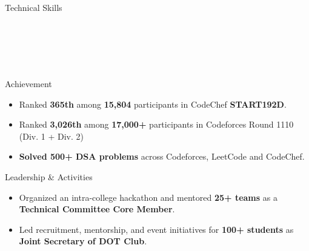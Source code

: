 \documentclass{resume}
\begin{document}
\begin{skillsSection}{Technical Skills}

    \skillItem[
        category={Languages:},
        skills={C/C++, Go, Python, Java, Javascript, SQL}
    ]
    \\
    \skillItem[
        category={Frontend:},
        skills={React.js, React Flow, Next.js, TypeScript}
    ]
    \\
    \skillItem[
        category={Backend \& System:},
        skills={FastAPI, Node.js, gRPC, REST APIs, Kafka, Redis}
    ]
    \\
    \skillItem[
        category={Cloud \& Infrastructure:},
        skills={AWS, EKS, Kubernetes, Docker, Terraform, Linux, IAM, EC2, VPC, Git, GitHub}
    ]
    \\
    \skillItem[
        category={Testing:},
        skills={Pytest, Vitest, Jest, Playwright, Cypress, Selenium}
    ]

\end{skillsSection}


\begin{achievementSection}{Achievement}

    \begin{itemize}
        \itemsep -6pt {}

        \item Ranked \textbf{365th} among \textbf{15,804} participants in CodeChef \textbf{START192D}.

        \item Ranked \textbf{3,026th} among \textbf{17,000+} participants in Codeforces Round 1110 (Div. 1 + Div. 2)

        \item \textbf{Solved 500+ DSA problems} across Codeforces, LeetCode and CodeChef.

    \end{itemize}

\end{achievementSection}


\begin{experienceSection}{Leadership \& Activities}

    \begin{itemize}
        \itemsep -6pt {}

        \item Organized an intra-college hackathon and mentored \textbf{25+ teams} as a \textbf{Technical Committee Core Member}.

        \item Led recruitment, mentorship, and event initiatives for \textbf{100+ students} as \textbf{Joint Secretary of DOT Club}.

    \end{itemize}

\end{experienceSection}
\end{document}
